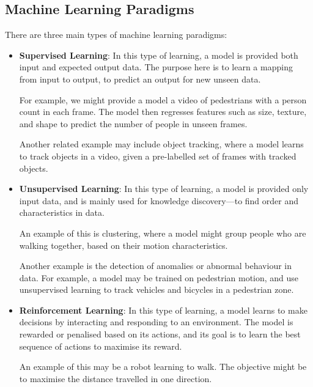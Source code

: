 \documentclass{article}
\begin{document}
\subsection{Machine Learning Paradigms}
There are three main types of machine learning paradigms:
\begin{itemize}
    \item \textbf{Supervised Learning}: In this type of learning, a
          model is provided both input and expected output data. The
          purpose here is to learn a mapping from input to output, to
          predict an output for new unseen data.

          For example, we might provide a model a video of pedestrians
          with a person count in each frame. The model then regresses
          features such as size, texture, and shape to predict the
          number of people in unseen frames.

          Another related example may include object tracking, where a
          model learns to track objects in a video, given a
          pre-labelled set of frames with tracked objects.
    \item \textbf{Unsupervised Learning}: In this type of learning, a
          model is provided only input data, and is mainly used for
          knowledge discovery---to find order and characteristics in
          data.

          An example of this is clustering, where a model might group
          people who are walking together, based on their motion
          characteristics.

          Another example is the detection of anomalies or abnormal
          behaviour in data. For example, a model may be trained on
          pedestrian motion, and use unsupervised learning to track
          vehicles and bicycles in a pedestrian zone.
    \item \textbf{Reinforcement Learning}: In this type of learning, a
          model learns to make decisions by interacting and responding
          to an environment. The model is rewarded or penalised based on
          its actions, and its goal is to learn the best sequence of
          actions to maximise its reward.

          An example of this may be a robot learning to walk. The
          objective might be to maximise the distance travelled in one
          direction.
\end{itemize}
\end{document}

